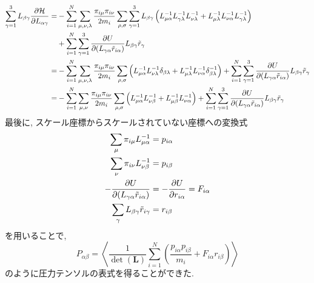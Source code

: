 \begin{align}
  \sum_{\gamma=1}^{3} L_{\beta\gamma} \frac{\partial \mathcal{H}}{\partial L_{\alpha\gamma}}
  =&
  -\sum_{i=1}^{N} \sum_{\mu,\nu,\lambda} \frac{\pi_{i\mu}\pi_{i\nu}}{2m_{i}}
  \sum_{\rho,\sigma} \sum_{\gamma=1}^{3} L_{\beta\gamma}
  \left(
    L_{\mu\alpha}^{-1} L_{\gamma\lambda}^{-1} L_{\nu\lambda}^{-1} +
    L_{\mu\lambda}^{-1} L_{\nu\alpha}^{-1} L_{\gamma\lambda}^{-1}
  \right)
  \\ &+
  \sum_{i=1}^{N} \sum_{\gamma=1}^{3}
  \frac{\partial U}{\partial (L_{\gamma\alpha} \Tilde{r}_{i\alpha})}
  L_{\beta\gamma} \tilde{r}_{\gamma}
  \\
  =&
  -\sum_{i=1}^{N} \sum_{\mu,\nu,\lambda} \frac{\pi_{i\mu}\pi_{i\nu}}{2m_{i}}
  \sum_{\rho,\sigma}
  \left(
    L_{\mu\alpha}^{-1} L_{\nu\lambda}^{-1} \delta_{\beta\lambda} +
    L_{\mu\lambda}^{-1} L_{\nu\alpha}^{-1} \delta_{\beta\lambda}^{-1}
  \right) +
  \sum_{i=1}^{N} \sum_{\gamma=1}^{3}
  \frac{\partial U}{\partial (L_{\gamma\alpha} \Tilde{r}_{i\alpha})}
  L_{\beta\gamma} \tilde{r}_{\gamma}
  \\
  =&
  -\sum_{i=1}^{N} \sum_{\mu,\nu} \frac{\pi_{i\mu}\pi_{i\nu}}{2m_{i}}
  \sum_{\rho,\sigma}
  \left(
    L_{\mu\alpha}^{-1} L_{\nu\beta}^{-1} +
    L_{\mu\beta}^{-1} L_{\nu\alpha}^{-1}
  \right) +
  \sum_{i=1}^{N} \sum_{\gamma=1}^{3}
  \frac{\partial U}{\partial (L_{\gamma\alpha} \Tilde{r}_{i\alpha})}
  L_{\beta\gamma} \tilde{r}_{\gamma}
\end{align}
最後に, スケール座標からスケールされていない座標への変換式
\begin{align}
  \sum_{\mu} \pi_{i\mu} L_{\mu\alpha}^{-1} &= p_{i\alpha} \\
  \sum_{\nu} \pi_{i\nu} L_{\nu\beta}^{-1} &= p_{i\beta} \\
  -\frac{\partial U}{\partial (L_{\gamma\alpha} \Tilde{r}_{i\alpha})} &=
  -\frac{\partial U}{\partial r_{i\alpha}} = F_{i\alpha}\\
  \sum_{\gamma} L_{\beta\gamma} \tilde{r}_{i\gamma} &= r_{i\beta}
\end{align}
を用いることで, 
\begin{equation}
  P_{\alpha\beta} =
  \left\langle
    \frac{1}{\det(\bm{L})} \sum_{i=1}^{N}
    \left(\frac{p_{i\alpha} p_{i\beta}}{m_{i}} + F_{i\alpha}r_{i\beta}\right)
  \right\rangle
\end{equation}
のように圧力テンソルの表式を得ることができた. 



